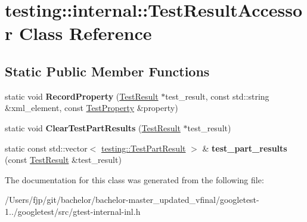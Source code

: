 \hypertarget{classtesting_1_1internal_1_1_test_result_accessor}{}\section{testing\+:\+:internal\+:\+:Test\+Result\+Accessor Class Reference}
\label{classtesting_1_1internal_1_1_test_result_accessor}
\subsection*{Static Public Member Functions}
\begin{DoxyCompactItemize}
\item 
\mbox{\label{classtesting_1_1internal_1_1_test_result_accessor_abcc4b32d1b201eeef92f0ec0ae161cf9}} 
static void {\bfseries Record\+Property} (\mbox{\hyperlink{classtesting_1_1_test_result}{Test\+Result}} $\ast$test\+\_\+result, const std\+::string \&xml\+\_\+element, const \mbox{\hyperlink{classtesting_1_1_test_property}{Test\+Property}} \&property)
\item 
\mbox{\label{classtesting_1_1internal_1_1_test_result_accessor_a53c626632bac65d82d88e432072b866b}} 
static void {\bfseries Clear\+Test\+Part\+Results} (\mbox{\hyperlink{classtesting_1_1_test_result}{Test\+Result}} $\ast$test\+\_\+result)
\item 
\mbox{\label{classtesting_1_1internal_1_1_test_result_accessor_a55d771904317c1b0cc380104d175f1db}} 
static const std\+::vector$<$ \mbox{\hyperlink{classtesting_1_1_test_part_result}{testing\+::\+Test\+Part\+Result}} $>$ \& {\bfseries test\+\_\+part\+\_\+results} (const \mbox{\hyperlink{classtesting_1_1_test_result}{Test\+Result}} \&test\+\_\+result)
\end{DoxyCompactItemize}


The documentation for this class was generated from the following file\+:\begin{DoxyCompactItemize}
\item 
/\+Users/fjp/git/bachelor/bachelor-\/master\+\_\+updated\+\_\+vfinal/googletest-\/1../googletest/src/gtest-\/internal-\/inl.\+h\end{DoxyCompactItemize}
